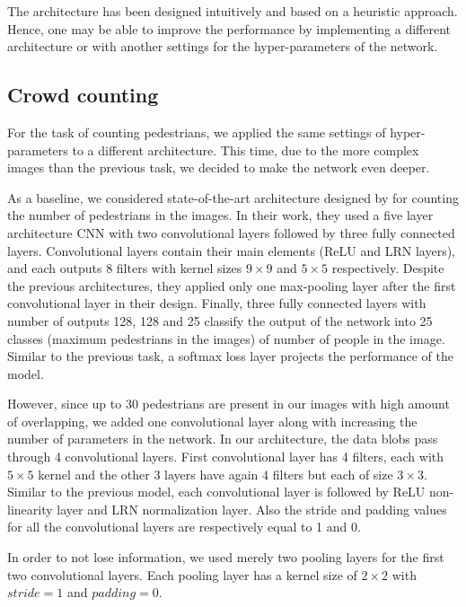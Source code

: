 The architecture has been designed intuitively and based on a heuristic approach. Hence, one may be able to improve the performance by implementing a different architecture or with another settings for the hyper-parameters of the network. 

\subsection{Crowd counting}
\label{subsec:ucsdarch}

For the task of counting pedestrians, we applied the same settings of hyper-parameters to a different architecture. This time, due to the more complex images than the previous task, we decided to make the network even deeper.

As a baseline, we considered state-of-the-art architecture designed by \citealt*{segui2015learning} for counting the number of pedestrians in the images. In their work, they used a five layer architecture CNN with two convolutional layers followed by three fully connected layers. Convolutional layers contain their main elements (ReLU and LRN layers), and each outputs 8 filters with kernel sizes $9\times9$ and $5\times5$ respectively. Despite the previous architectures, they applied only one max-pooling layer after the first convolutional layer in their design. Finally, three fully connected layers with number of outputs 128, 128 and 25 classify the output of the network into 25 classes (maximum pedestrians in the images) of number of people in the image. Similar to the previous task, a softmax loss layer projects the performance of the model.   

\noindent However, since up to 30 pedestrians are present in our images with high amount of overlapping, we added one convolutional layer along with increasing the number of parameters in the network. In our architecture, the data blobs pass through 4 convolutional layers. First convolutional layer has 4 filters, each with $5\times5$ kernel and the other 3 layers have again 4 filters but each of size $3\times3$. Similar to the previous model, each convolutional layer is followed by ReLU non-linearity layer and LRN normalization layer. Also the stride and padding values for all the convolutional layers are respectively equal to 1 and 0. 

\indent In order to not lose information, we used merely two pooling layers for the first two convolutional layers. Each pooling layer has a kernel size of $2\times2$ with $stride = 1$  and $padding = 0$. 


